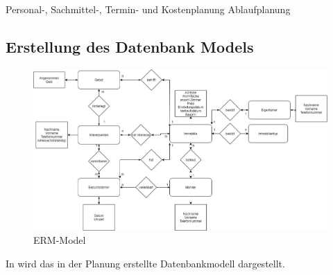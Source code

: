 
Personal-, Sachmittel-, Termin- und Kostenplanung
Ablaufplanung

\subsection{Erstellung des Datenbank Models}
\begin{figure}[H]
    \includegraphics[width=\textwidth]{images/Immobilien_ERD}
    \caption{ERM-Model}
    \label{fig:erm}
\end{figure}
In  wird das in der Planung erstellte Datenbankmodell dargestellt.
